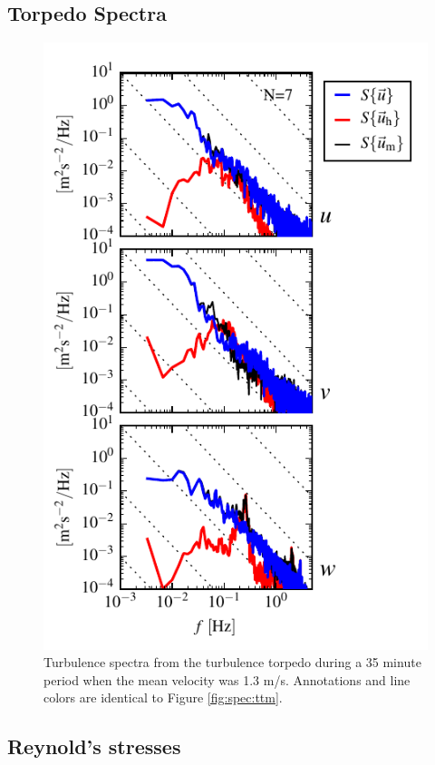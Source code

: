 \documentclass[twocol]{ametsoc}
\begin{document}
\subsection{Torpedo Spectra}

\begin{figure}[t]
  \centering
  \includegraphics{SpecFig03_TTT}
  \caption{Turbulence spectra from the turbulence torpedo during a 35 minute period when the mean velocity was 1.3 m/s. Annotations and line colors are identical to Figure \ref{fig:spec:ttm}.}
  \label{fig:spec:ttt}
\end{figure}

\subsection{Reynold's stresses}
\end{document}
